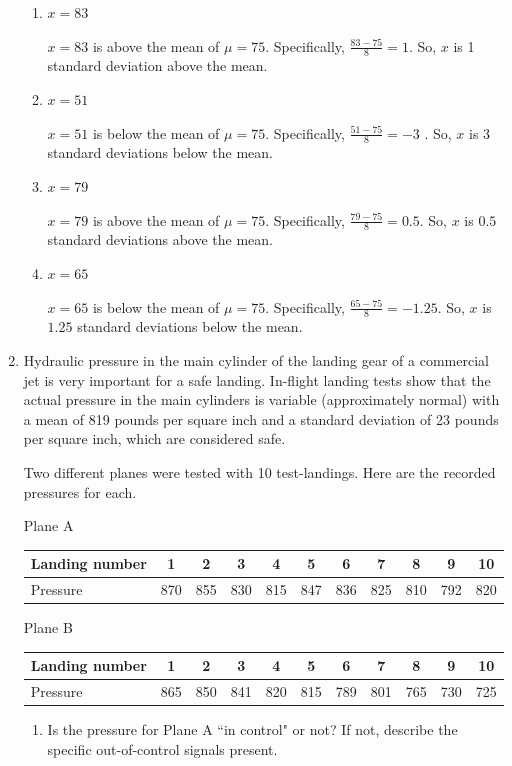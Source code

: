 \documentclass{article}
\newcommand{\answer}[1]{\color{white}#1}
\begin{document}
\begin{enumerate}
	\begin{enumerate}
	\item $x=83$ 
	
	{\answer $x=83$ is above the mean of $\mu = 75$.  Specifically, $\frac{83-75}{8} = 1$.  So, $x$ is 1 standard deviation above the mean.}
	\item $x=51$ 
	
	{\answer $x=51$ is below the mean of $\mu = 75$.  Specifically, $\frac{51-75}{8} = -3$ .  So, $x$ is 3 standard deviations below the mean.}
	\item $x=79$ 
	
	{\answer $x=79$ is above the mean of $\mu = 75$.  Specifically, $\frac{79-75}{8} = 0.5$.  So, $x$ is $0.5$ standard deviations above the mean.}
	\item $x=65$ 
	
	{\answer $x=65$ is below the mean of $\mu = 75$.  Specifically, $\frac{65-75}{8} = -1.25$.  So, $x$ is $1.25$ standard deviations below the mean.}
	\end{enumerate}

\item Hydraulic pressure in the main cylinder of the landing gear of a commercial jet is very important for a safe landing.  In-flight landing tests show that the actual pressure in the main cylinders is variable (approximately normal) with a mean of 819 pounds per square inch and a standard deviation of 23 pounds per square inch, which are considered safe.

Two different planes were tested with 10 test-landings.  Here are the recorded pressures for each. 

Plane A 

\begin{tabular}{l|cccccccccc}
\hline 
Landing number  & 1& 2 & 3 & 4 & 5 & 6 & 7 & 8 & 9 & 10 \\
\hline
Pressure & 870 & 855 & 830 & 815 & 847 & 836 & 825 & 810 & 792 & 820 \\
\hline
\end{tabular}

Plane B 

\begin{tabular}{l|cccccccccc}
\hline 
Landing number  & 1& 2 & 3 & 4 & 5 & 6 & 7 & 8 & 9 & 10 \\
\hline
Pressure & 865 & 850 & 841 & 820 & 815 & 789 & 801 & 765 & 730 & 725 \\
\hline
\end{tabular}

	\begin{enumerate}
	\item  Is the pressure for Plane A ``in control" or not?  If not, describe the specific out-of-control signals present. 
	

\end{enumerate}
\end{enumerate}
\end{document}
